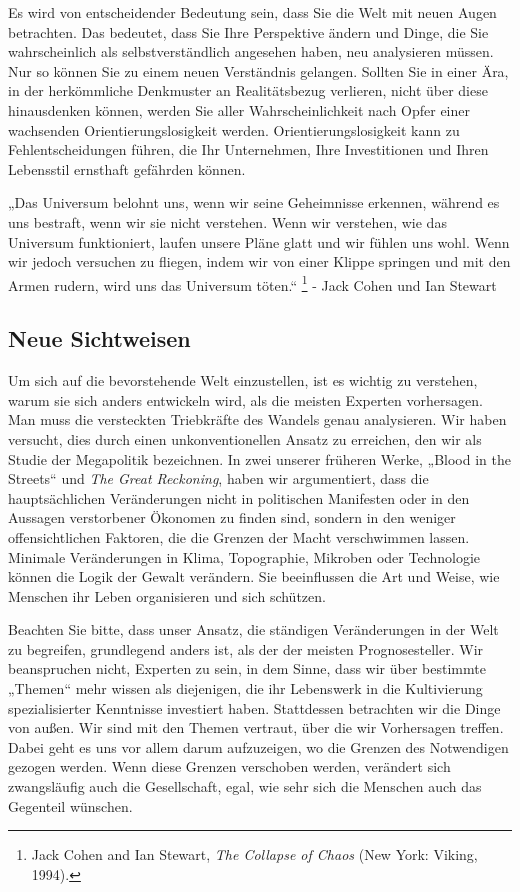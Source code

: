 \documentclass[
  a5paper,
  smalldemyvopaper,10pt,twoside,onecolumn,openright,extrafontsizes,hidelinks]{memoir}
\renewenvironment{quote}%
               {\list{}{\rightmargin=.6cm\leftmargin=.6cm}%
                \itshape \item[]}%
               {\endlist}
\begin{document}
Es wird von entscheidender Bedeutung sein, dass Sie die Welt mit neuen
Augen betrachten. Das bedeutet, dass Sie Ihre Perspektive ändern und
Dinge, die Sie wahrscheinlich als selbstverständlich angesehen haben,
neu analysieren müssen. Nur so können Sie zu einem neuen Verständnis
gelangen. Sollten Sie in einer Ära, in der herkömmliche Denkmuster an
Realitätsbezug verlieren, nicht über diese hinausdenken können, werden
Sie aller Wahrscheinlichkeit nach Opfer einer wachsenden
Orientierungslosigkeit werden. Orientierungslosigkeit kann zu
Fehlentscheidungen führen, die Ihr Unternehmen, Ihre Investitionen und
Ihren Lebensstil ernsthaft gefährden können.

\begin{quote}
„Das Universum belohnt uns, wenn wir seine Geheimnisse erkennen, während
es uns bestraft, wenn wir sie nicht verstehen. Wenn wir verstehen, wie
das Universum funktioniert, laufen unsere Pläne glatt und wir fühlen uns
wohl. Wenn wir jedoch versuchen zu fliegen, indem wir von einer Klippe
springen und mit den Armen rudern, wird uns das Universum töten.``
\footnote{Jack Cohen and Ian Stewart, \emph{The Collapse of Chaos} (New
  York: Viking, 1994).} - Jack Cohen und Ian Stewart
\end{quote}

\subsection{Neue Sichtweisen}\label{neue-sichtweisen}

Um sich auf die bevorstehende Welt einzustellen, ist es wichtig zu
verstehen, warum sie sich anders entwickeln wird, als die meisten
Experten vorhersagen. Man muss die versteckten Triebkräfte des Wandels
genau analysieren. Wir haben versucht, dies durch einen
unkonventionellen Ansatz zu erreichen, den wir als Studie der
Megapolitik bezeichnen. In zwei unserer früheren Werke, „Blood in the
Streets`` und \emph{The Great Reckoning}, haben wir argumentiert, dass
die hauptsächlichen Veränderungen nicht in politischen Manifesten oder
in den Aussagen verstorbener Ökonomen zu finden sind, sondern in den
weniger offensichtlichen Faktoren, die die Grenzen der Macht
verschwimmen lassen. Minimale Veränderungen in Klima, Topographie,
Mikroben oder Technologie können die Logik der Gewalt verändern. Sie
beeinflussen die Art und Weise, wie Menschen ihr Leben organisieren und
sich schützen.

Beachten Sie bitte, dass unser Ansatz, die ständigen Veränderungen in
der Welt zu begreifen, grundlegend anders ist, als der der meisten
Prognosesteller. Wir beanspruchen nicht, Experten zu sein, in dem Sinne,
dass wir über bestimmte „Themen`` mehr wissen als diejenigen, die ihr
Lebenswerk in die Kultivierung spezialisierter Kenntnisse investiert
haben. Stattdessen betrachten wir die Dinge von außen. Wir sind mit den
Themen vertraut, über die wir Vorhersagen treffen. Dabei geht es uns vor
allem darum aufzuzeigen, wo die Grenzen des Notwendigen gezogen werden.
Wenn diese Grenzen verschoben werden, verändert sich zwangsläufig auch
die Gesellschaft, egal, wie sehr sich die Menschen auch das Gegenteil
wünschen.
\end{document}
